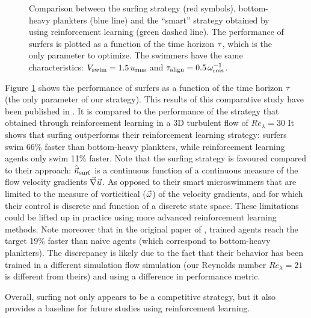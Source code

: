 \begin{figure}%
    \centering
    
    \caption[Comparison of the surfing strategy to the result of a reinforcement learning algorithm in turbulence.]{
    	Comparison between the surfing strategy (red symbols), bottom-heavy plankters (blue line) and the ``smart'' strategy obtained by \citet{Alageshan2020} using reinforcement learning (green dashed line).
   		The performance of surfers is plotted as a function of the time horizon $\tau$, which is the only parameter to optimize. The swimmers have the same characteristics: $V_{\mathrm{swim}} = 1.5 \,u_{\mathrm{rms}}$ and $\tau_{\mathrm{align}} = 0.5\, \omega_{\mathrm{rms}}^{-1}$.
    }
    \label{fig:comparison_reinforcement_learning}
\end{figure}
Figure \ref{fig:comparison_reinforcement_learning} shows the performance of surfers as a function of the time horizon $\tau$ (the only parameter of our strategy).
This results of this comparative study have been published in \citet{monthiller2022surfing}.
It is compared to the performance of the strategy that \citet{Alageshan2020} obtained through reinforcement learning in a 3D turbulent flow of $\mathit{Re}_{\lambda} = 30$ 
It shows that surfing outperforms their reinforcement learning strategy: surfers swim 66\% faster than bottom-heavy plankters, while reinforcement learning agents only swim 11\% faster. Note that the surfing strategy is favoured compared to their approach: $\hat{\vec{n}}_{\mathrm{surf}}$ is a continuous function of a continuous measure of the flow velocity gradients $\vec{\nabla} \vec{u}$.
As opposed to their smart microswimmers that are limited to the measure of vorticitical ($\vec{\omega}$) of the velocity gradients, and for which their control is discrete and function of a discrete state space. 
These limitations could be lifted up in practice using more advanced reinforcement learning methods.
Note moreover that in the original paper of \citet{Alageshan2020}, trained agents reach the target 19\% faster than naive agents (which correspond to bottom-heavy plankters).
The discrepancy is likely due to the fact that their behavior has been trained in a different simulation flow simulation (our Reynolds number $\mathit{Re}_{\lambda} = 21$ is different from theirs) and using a difference in performance metric.

Overall, surfing not only appears to be a competitive strategy, but it also provides a baseline for future studies using reinforcement learning.

